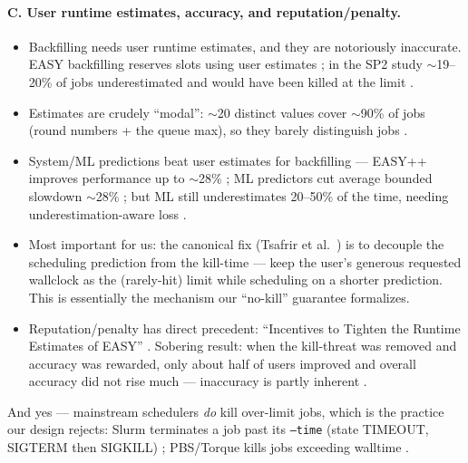 \documentclass{article}
\begin{document}
\paragraph{C. User runtime estimates, accuracy, and reputation/penalty.}
\begin{itemize}
\item Backfilling needs user runtime estimates, and they are notoriously inaccurate.
EASY backfilling reserves slots using user estimates \cite{r29}; in the SP2 study
$\sim$19--20\% of jobs underestimated and would have been killed at the limit
\cite{r29}.
\item Estimates are crudely ``modal'': $\sim$20 distinct values cover $\sim$90\% of
jobs (round numbers + the queue max), so they barely distinguish jobs \cite{r30}.
\item System/ML predictions beat user estimates for backfilling --- EASY++ improves
performance up to $\sim$28\% \cite{r31}; ML predictors cut average bounded slowdown
$\sim$28\% \cite{r35}; but ML still underestimates 20--50\% of the time, needing
underestimation-aware loss \cite{r36}.
\item Most important for us: the canonical fix (Tsafrir et al.\ \cite{r31}) is to
decouple the scheduling prediction from the kill-time --- keep the user's generous
requested wallclock as the (rarely-hit) limit while scheduling on a shorter
prediction. This is essentially the mechanism our ``no-kill'' guarantee formalizes.
\item Reputation/penalty has direct precedent: ``Incentives to Tighten the Runtime
Estimates of EASY'' \cite{r34}. Sobering result: when the kill-threat was removed and
accuracy was rewarded, only about half of users improved and overall accuracy did not
rise much --- inaccuracy is partly inherent \cite{r32,r33}.
\end{itemize}
And yes --- mainstream schedulers \emph{do} kill over-limit jobs, which is the
practice our design rejects: Slurm terminates a job past its \texttt{--time} (state
TIMEOUT, SIGTERM then SIGKILL) \cite{r37}; PBS/Torque kills jobs exceeding walltime
\cite{r38}.
\end{document}
